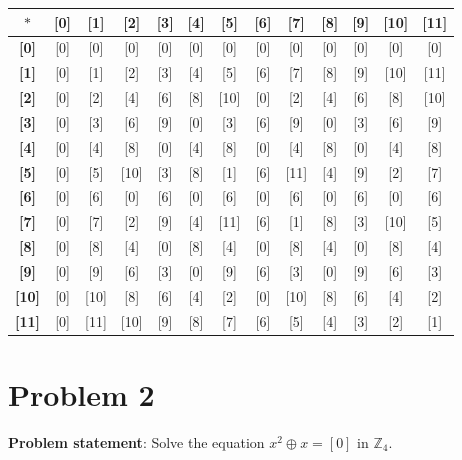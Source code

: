 \documentclass{article} %
\begin{document}
\begin{addmargin}[1em]{0em}
\begin{tabular}{|c|c|c|c|c|c|c|c|c|c|c|c|c|}
\end{tabular}

\begin{tabular}{|c|c|c|c|c|c|c|c|c|c|c|c|c|}
\hline
\textbf{$*$}&\textbf{[0]}&\textbf{[1]}&\textbf{[2]}&\textbf{[3]}&\textbf{[4]}&\textbf{[5]}&\textbf{[6]}&\textbf{[7]}&\textbf{[8]}&\textbf{[9]}&\textbf{[10]}&\textbf{[11]}\\ \hline
\textbf{[0]} & [0] & [0] & [0] & [0] & [0] & [0] & [0] & [0] & [0] & [0] & [0] & [0] \\ \hline
\textbf{[1]} & [0] & [1] & [2] & [3] & [4] & [5] & [6] & [7] & [8] & [9] & [10] & [11]\\ \hline
\textbf{[2]} & [0] & [2] & [4] & [6] & [8] & [10] & [0] & [2] & [4] & [6] & [8] & [10]\\ \hline
\textbf{[3]} & [0] & [3] & [6] & [9] & [0] & [3] & [6] & [9] & [0] & [3] & [6] & [9]\\ \hline
\textbf{[4]} & [0] & [4] & [8] & [0] & [4] & [8] & [0] & [4] & [8] & [0] & [4] & [8]\\ \hline
\textbf{[5]} & [0] & [5] & [10] & [3] & [8] & [1] & [6] & [11] & [4] & [9] & [2] & [7]\\ \hline
\textbf{[6]} & [0] & [6] & [0] & [6] & [0] & [6] & [0] & [6] & [0] & [6] & [0] & [6]\\ \hline
\textbf{[7]} & [0] & [7] & [2] & [9] & [4] & [11] & [6] & [1] & [8] & [3] & [10] & [5]\\ \hline
\textbf{[8]} & [0] & [8] & [4] & [0] & [8] & [4] & [0] & [8] & [4] & [0] & [8] & [4]\\ \hline
\textbf{[9]} & [0] & [9] & [6] & [3] & [0] & [9] & [6] & [3] & [0] & [9] & [6] & [3]\\ \hline
\textbf{[10]} & [0] & [10] & [8] & [6] & [4] & [2] & [0] & [10] & [8] & [6] & [4] & [2] \\ \hline
\textbf{[11]} & [0] & [11] & [10] & [9] & [8] & [7] & [6] & [5] & [4] & [3] & [2] & [1]\\ \hline

\end{tabular}
\end{addmargin}    

\newpage

\section*{Problem 2}

\textbf{Problem statement}: Solve the equation $x^2 \oplus x = [0]$ in $\mathbb{Z}_4$.
\\
\end{document}

